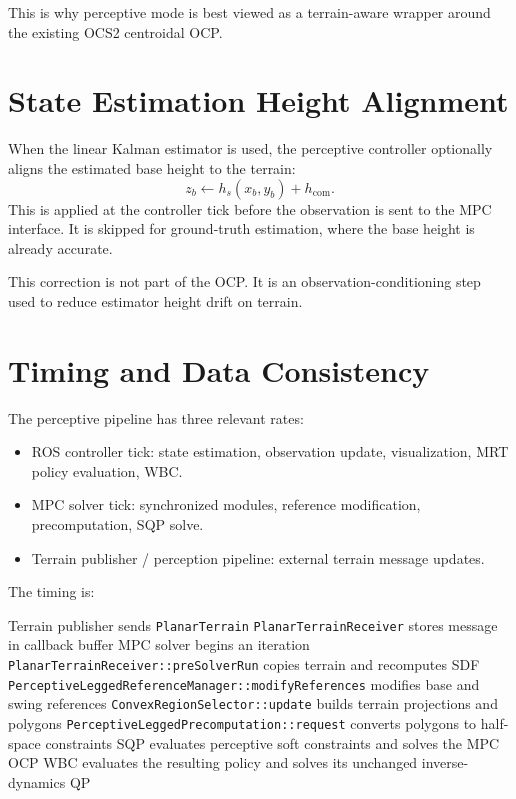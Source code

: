 \documentclass[11pt,a4paper]{article}
\begin{document}
This is why perceptive mode is best viewed as a terrain-aware wrapper around the existing OCS2 centroidal OCP.


\section{State Estimation Height Alignment}

When the linear Kalman estimator is used, the perceptive controller optionally aligns the estimated base height to the terrain:
\begin{equation}
	z_b
	\leftarrow
	h_s(x_b,y_b)
	+
	h_{\text{com}}.
\end{equation}
This is applied at the controller tick before the observation is sent to the MPC interface. It is skipped for ground-truth estimation, where the base height is already accurate.

This correction is not part of the OCP. It is an observation-conditioning step used to reduce estimator height drift on terrain.


\section{Timing and Data Consistency}

The perceptive pipeline has three relevant rates:
\begin{itemize}
	\item ROS controller tick: state estimation, observation update, visualization, MRT policy evaluation, WBC.
	\item MPC solver tick: synchronized modules, reference modification, precomputation, SQP solve.
	\item Terrain publisher / perception pipeline: external terrain message updates.
\end{itemize}

The timing is:
\begin{algorithm}
	\caption{Perceptive MPC Timing}
	\begin{algorithmic}[1]
		\STATE Terrain publisher sends \texttt{PlanarTerrain}
		\STATE \texttt{PlanarTerrainReceiver} stores message in callback buffer
		\STATE MPC solver begins an iteration
		\STATE \texttt{PlanarTerrainReceiver::preSolverRun} copies terrain and recomputes SDF
		\STATE \texttt{PerceptiveLeggedReferenceManager::modifyReferences} modifies base and swing references
		\STATE \texttt{ConvexRegionSelector::update} builds terrain projections and polygons
		\STATE \texttt{PerceptiveLeggedPrecomputation::request} converts polygons to half-space constraints
		\STATE SQP evaluates perceptive soft constraints and solves the MPC OCP
		\STATE WBC evaluates the resulting policy and solves its unchanged inverse-dynamics QP
	\end{algorithmic}
\end{algorithm}
\end{document}
